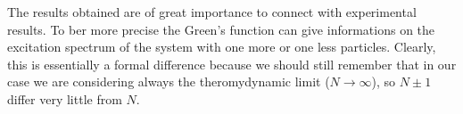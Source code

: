 \documentclass[../main/main.tex]{subfiles}
\begin{document}
The results obtained are of great importance to connect with experimental results. To ber more precise the Green's function can give informations on the excitation spectrum of the system with one more or one less particles.
Clearly, this is essentially a formal difference because we should still remember that in our case we are considering always the theromydynamic limit (\( N \rightarrow \infty  \)), so  \( N\pm 1 \) differ very little from \( N \).
\end{document}

